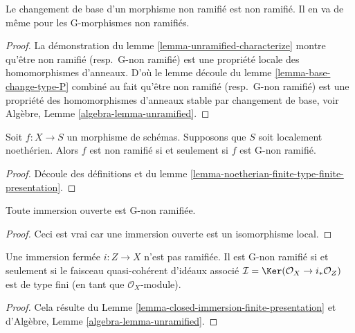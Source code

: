 \begin{lemma}
\label{lemma-base-change-unramified}
Le changement de base d'un morphisme non ramifié est non ramifié. Il en
va de même pour les G-morphismes non ramifiés.
\end{lemma}

\begin{proof}
La démonstration du lemme \ref{lemma-unramified-characterize} montre qu'être non
ramifié (resp.\ G-non ramifié) est une
propriété locale des homomorphismes d'anneaux. D'où le lemme
découle du lemme \ref{lemma-base-change-type-P} combiné au fait
qu'être non ramifié (resp.\ G-non ramifié) est
une propriété des homomorphismes d'anneaux stable par changement
de base, voir Algèbre, Lemme \ref{algebra-lemma-unramified}.
\end{proof}

\begin{lemma}
\label{lemma-noetherian-unramified}
Soit $f : X \to S$ un morphisme de schémas. Supposons que $S$ soit localement noethérien. Alors $f$
est non ramifié si et seulement si $f$ est G-non ramifié.
\end{lemma}

\begin{proof}
Découle des définitions
et du lemme \ref{lemma-noetherian-finite-type-finite-presentation}.
\end{proof}


\begin{lemma}
\label{lemma-open-immersion-unramified}
Toute immersion ouverte est G-non ramifiée.
\end{lemma}

\begin{proof}
Ceci est vrai car une immersion ouverte est un isomorphisme local.
\end{proof}

\begin{lemma}
\label{lemma-closed-immersion-unramified}
Une immersion fermée $i : Z \to X$ n'est pas
ramifiée. Il est G-non ramifié si et seulement si le faisceau
quasi-cohérent d'idéaux associé $\mathcal{I} = \Ker(\mathcal{O}_X \to i_*\mathcal{O}_Z)$ est de type
fini (en tant que $\mathcal{O}_X$-module).
\end{lemma}

\begin{proof}
Cela résulte du Lemme \ref{lemma-closed-immersion-finite-presentation} et d'Algèbre,
Lemme \ref{algebra-lemma-unramified}.
\end{proof}

